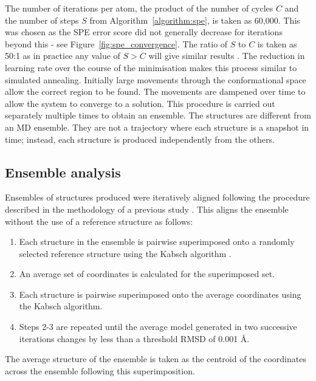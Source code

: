 The number of iterations per atom, the product of the number of cycles $C$ and the number of steps $S$ from Algorithm~\ref{algorithm:spe}, is taken as 60,000.
This was chosen as the SPE error score did not generally decrease for iterations beyond this - see Figure~\ref{fig:spe_convergence}.
The ratio of $S$ to $C$ is taken as 50:1 as in practice any value of $S > C$ will give similar results \cite{Agrafiotis2013}.
The reduction in learning rate over the course of the minimisation makes this process similar to simulated annealing.
Initially large movements through the conformational space allow the correct region to be found.
The movements are dampened over time to allow the system to converge to a solution.
This procedure is carried out separately multiple times to obtain an ensemble.
The structures are different from an MD ensemble.
They are not a trajectory where each structure is a snapshot in time; instead, each structure is produced independently from the others.


\subsection{Ensemble analysis}

Ensembles of structures produced were iteratively aligned following the procedure described in the methodology of a previous study \cite{Bakan2009}.
This aligns the ensemble without the use of a reference structure as follows:

\begin{enumerate}
\item Each structure in the ensemble is pairwise superimposed onto a randomly selected reference structure using the Kabsch algorithm \cite{Kabsch1976}.
\item An average set of coordinates is calculated for the superimposed set.
\item Each structure is pairwise superimposed onto the average coordinates using the Kabsch algorithm.
\item Steps 2-3 are repeated until the average model generated in two successive iterations changes by less than a threshold RMSD of 0.001 \AA.
\end{enumerate}

The average structure of the ensemble is taken as the centroid of the coordinates across the ensemble following this superimposition.

